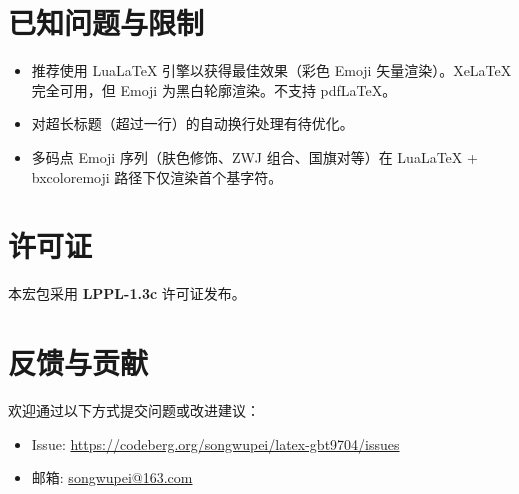 \documentclass[redline, titleindent, zhlineskip]{gbt9704}
\begin{document}
\section{已知问题与限制}
\begin{itemize}
  \item 推荐使用 LuaLaTeX 引擎以获得最佳效果（彩色 Emoji 矢量渲染）。XeLaTeX 完全可用，但 Emoji 为黑白轮廓渲染。不支持 pdfLaTeX。
  \item 对超长标题（超过一行）的自动换行处理有待优化。
  \item 多码点 Emoji 序列（肤色修饰、ZWJ 组合、国旗对等）在 LuaLaTeX + bxcoloremoji 路径下仅渲染首个基字符。
\end{itemize}

\section{许可证}
本宏包采用 \textbf{LPPL-1.3c} 许可证发布。

\section{反馈与贡献}
欢迎通过以下方式提交问题或改进建议：
\begin{itemize}
  \item Issue: \url{https://codeberg.org/songwupei/latex-gbt9704/issues}
  \item 邮箱: \url{songwupei@163.com}
\end{itemize}
\end{document}
